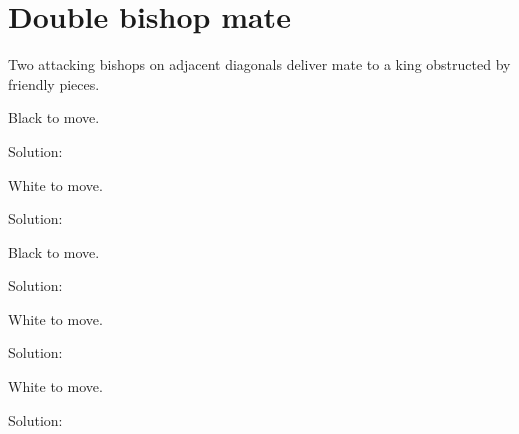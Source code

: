 \documentclass{book}
\begin{document}
\section{Double bishop mate}
Two attacking bishops on adjacent diagonals deliver mate to a king obstructed by friendly pieces.\begin{multicols}{2} 
\begin{samepage} 
\newgame 


 
\showboard
 
 Black to move. 
 
Solution: 
 
\end{samepage}\begin{samepage} 
\newgame 


 
\showboard
 
 White to move. 
 
Solution: 
 
\end{samepage}\begin{samepage} 
\newgame 


 
\showboard
 
 Black to move. 
 
Solution: 
 
\end{samepage}\begin{samepage} 
\newgame 


 
\showboard
 
 White to move. 
 
Solution: 
 
\end{samepage}\begin{samepage} 
\newgame 


 
\showboard
 
 White to move. 
 
Solution: 
 

\end{samepage}
\end{multicols}
\end{document}
